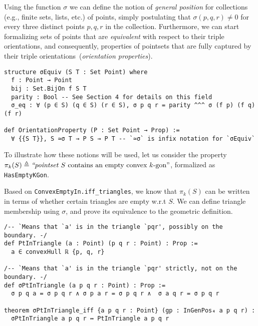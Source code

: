 Using the function $\sigma$ we can define the notion of \emph{general position} for collections (e.g., finite sets, lists, etc.) of points, simply postulating that $\sigma(p, q, r) \neq 0$ for every three distinct points $p, q, r$ in the collection.
Furthermore, we can start formalizing sets of points that are \emph{equivalent} with respect to their triple orientations, and consequently, properties of pointsets that are fully captured by their triple orientations~(\emph{orientation properties}).
% 
\begin{lstlisting}
structure σEquiv (S T : Set Point) where
  f : Point → Point
  bij : Set.BijOn f S T
  parity : Bool -- See Section 4 for details on this field
  σ_eq : ∀ (p ∈ S) (q ∈ S) (r ∈ S), σ p q r = parity ^^^ σ (f p) (f q) (f r)

def OrientationProperty (P : Set Point → Prop) :=
  ∀ {{S T}}, S ≃σ T → P S → P T -- `≃σ` is infix notation for `σEquiv`
\end{lstlisting}

To illustrate how these notions will be used, let us consider the property
\(
  \pi_k(S) \triangleq \text{\em ``pointset } S \text{ contains an empty convex } k\text{-gon''}
\), formalized as \lstinline|HasEmptyKGon|.

Based on \lstinline|ConvexEmptyIn.iff_triangles|, we know that $\pi_k(S)$ can be written
in terms of whether certain triangles are empty w.r.t $S$.
We can define triangle membership using $\sigma$,
and prove its equivalence to the geometric definition.
\begin{lstlisting}
/-- `Means that `a' is in the triangle `pqr', possibly on the boundary. -/
def PtInTriangle (a : Point) (p q r : Point) : Prop :=
  a ∈ convexHull ℝ {p, q, r}

/-- `Means that `a' is in the triangle `pqr' strictly, not on the boundary. -/
def σPtInTriangle (a p q r : Point) : Prop :=
  σ p q a = σ p q r ∧ σ p a r = σ p q r ∧  σ a q r = σ p q r

theorem σPtInTriangle_iff {a p q r : Point} (gp : InGenPos₄ a p q r) :
  σPtInTriangle a p q r ↔ PtInTriangle a p q r
\end{lstlisting}



